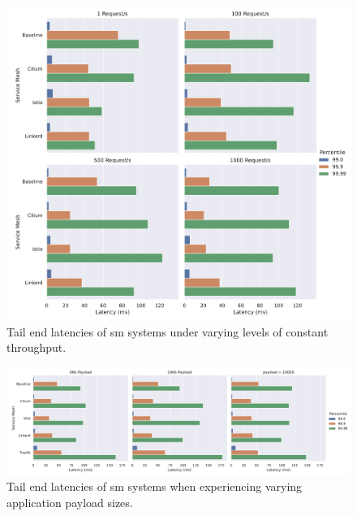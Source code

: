 \begin{figure}[p]
    \centering
    
    \includegraphics[width=1\linewidth]{5_experimental_evaluation/figures/exp-02-tail-latencies-all.pdf}

    \caption[Tail end latencies of \gls{sm} systems under varying levels of constant throughput]{Tail end latencies of \gls{sm} systems under varying levels of constant throughput.}
    
    \label{fig:exp:02:tail-latencies}
\end{figure}



\begin{figure}[p]
    \centering
    
    \includegraphics[width=1\linewidth]{5_experimental_evaluation/figures/exp-03-tail-latencies-all.pdf}

    \caption[Tail end latencies of \gls{sm} systems when experiencing varying application payload sizes]{Tail end latencies of \gls{sm} systems when experiencing varying application payload sizes.}
    
    \label{fig:exp:03:tail-latencies}
\end{figure}